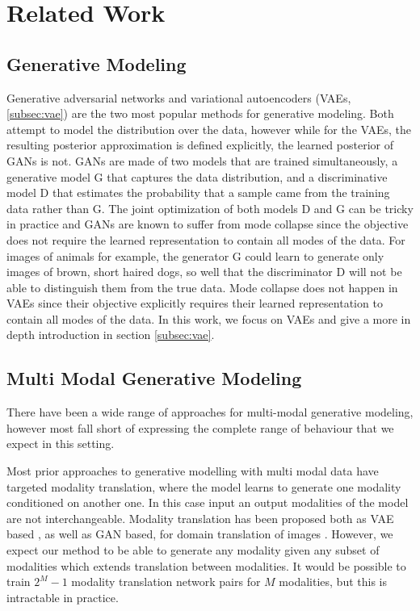 \chapter{Related Work}
\section{Generative Modeling}
Generative adversarial networks \citep[GANs]{goodfellow_generative_2014} and variational autoencoders (VAEs, \cref{subsec:vae}) are the two most popular methods for generative modeling.
Both attempt to model the distribution over the data, however while for the VAEs, the resulting posterior approximation is defined explicitly, the learned posterior of GANs is not.
GANs are made of two models that are trained simultaneously, a generative model G that captures the data distribution, and a discriminative model D that estimates the probability that a sample came from the training data rather than G.
The joint optimization of both models D and G can be tricky in practice and GANs are known to suffer from mode collapse since the objective does not require the learned representation to contain all modes of the data.
For images of animals for example, the generator G could learn to generate only images of brown, short haired dogs, so well that the discriminator D will not be able to distinguish them from the true data.
Mode collapse does not happen in VAEs since their objective explicitly requires their learned representation to contain all modes of the data.
In this work, we focus on VAEs and give a more in depth introduction in section \cref{subsec:vae}.

\section{Multi Modal Generative Modeling}

There have been a wide range of approaches for multi-modal generative modeling, however most fall short of expressing the complete range of behaviour that we expect in this setting.

Most prior approaches to generative modelling with multi modal data have targeted modality translation, where the model learns to generate one modality conditioned on another one.
In this case input an output modalities of the model are not interchangeable.
Modality translation has been proposed both as VAE based \citep{pandey2017variational, pu2016variational}, as well as GAN based, for domain translation of images \citep{ledig2017photo, liu2019few}.
However, we expect our method to be able to generate any modality given any subset of modalities which extends translation between modalities.
It would be possible to train $2^M -1$ modality translation network pairs for $M$ modalities, but this is intractable in practice.

